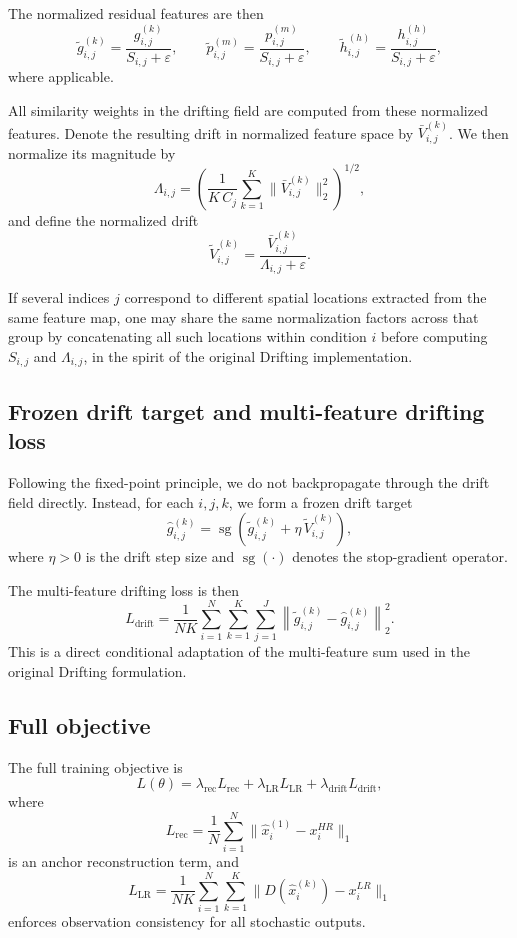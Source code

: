 \documentclass{article}
\begin{document}
The normalized residual features are then
\[
\tilde g_{i,j}^{(k)}=\frac{g_{i,j}^{(k)}}{S_{i,j}+\varepsilon},
\qquad
\tilde p_{i,j}^{(m)}=\frac{p_{i,j}^{(m)}}{S_{i,j}+\varepsilon},
\qquad
\tilde h_{i,j}^{(h)}=\frac{h_{i,j}^{(h)}}{S_{i,j}+\varepsilon},
\]
where applicable.

All similarity weights in the drifting field are computed from these normalized features. Denote the resulting drift in normalized feature space by \(\bar V_{i,j}^{(k)}\). We then normalize its magnitude by
\[
\Lambda_{i,j}
=
\left(
\frac{1}{K\,C_j}
\sum_{k=1}^{K}
\|\bar V_{i,j}^{(k)}\|_2^2
\right)^{1/2},
\]
and define the normalized drift
\[
\tilde V_{i,j}^{(k)}
=
\frac{\bar V_{i,j}^{(k)}}{\Lambda_{i,j}+\varepsilon}.
\]

If several indices \(j\) correspond to different spatial locations extracted from the same feature map, one may share the same normalization factors across that group by concatenating all such locations within condition \(i\) before computing \(S_{i,j}\) and \(\Lambda_{i,j}\), in the spirit of the original Drifting implementation.

\subsection{Frozen drift target and multi-feature drifting loss}

Following the fixed-point principle, we do not backpropagate through the drift field directly. Instead, for each \(i,j,k\), we form a frozen drift target
\[
\hat g_{i,j}^{(k)}
=
\operatorname{sg}
\left(
\tilde g_{i,j}^{(k)}+\eta\,\tilde V_{i,j}^{(k)}
\right),
\]
where \(\eta>0\) is the drift step size and \(\operatorname{sg}(\cdot)\) denotes the stop-gradient operator.

The multi-feature drifting loss is then
\[
L_{\mathrm{drift}}
=
\frac{1}{NK}
\sum_{i=1}^{N}\sum_{k=1}^{K}\sum_{j=1}^{J}
\left\|
\tilde g_{i,j}^{(k)}-\hat g_{i,j}^{(k)}
\right\|_2^2.
\]
This is a direct conditional adaptation of the multi-feature sum used in the original Drifting formulation. 

\subsection{Full objective}

The full training objective is
\[
L(\theta)
=
\lambda_{\mathrm{rec}}L_{\mathrm{rec}}
+
\lambda_{\mathrm{LR}}L_{\mathrm{LR}}
+
\lambda_{\mathrm{drift}}L_{\mathrm{drift}},
\]
where
\[
L_{\mathrm{rec}}
=
\frac{1}{N}
\sum_{i=1}^{N}
\|\hat{x}_i^{(1)}-x_i^{HR}\|_1
\]
is an anchor reconstruction term, and
\[
L_{\mathrm{LR}}
=
\frac{1}{NK}
\sum_{i=1}^{N}\sum_{k=1}^{K}
\|D(\hat{x}_i^{(k)})-x_i^{LR}\|_1
\]
enforces observation consistency for all stochastic outputs.
\end{document}
